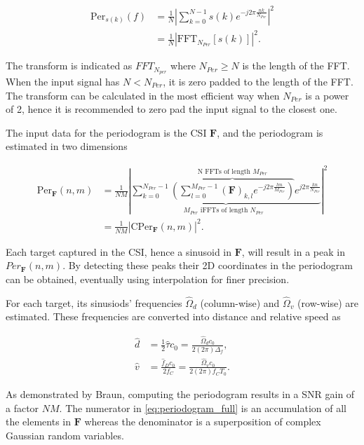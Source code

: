     \begin{align}
        \text{Per}_{s(k)}(f) &= \frac{1}{N}\left| \sum_{k=0}^{N-1} s(k)e^{-j2\pi \frac{nk}{N_{Per}}}\right|^2 \\
        &= \frac{1}{N}\left| \text{FFT}_{N_{Per}}[s(k)]\right|^2.
    \end{align}
    
    
    The transform is indicated as $FFT_{N_{per}}$ where $N_{Per} \geq N$ is the length of the FFT. When the input signal has $N < N_{Per}$, it is zero padded to the length of the FFT.
    The transform can be calculated in the most efficient way when $N_{Per}$ is a power of 2, hence it is recommended to zero pad the input signal to the closest one.

    The input data for the periodogram is the CSI $\bm{F}$, and the periodogram is estimated in two dimensions

    \begin{align}
        \text{Per}_{\bm{F}}(n,m) &= \frac{1}{NM} \left| \underbrace{ \sum_{k=0}^{N_{Per}-1}  \overbrace{\left(  \sum_{l=0}^{M_{Per}-1} (\bm{F})_{k,l} e^{-j2\pi \frac{lm}{M_{Per}}} \right)}^{\text{N FFTs of length $M_{Per}$}}  e^{j2\pi\frac{kn}{N_{Per}}}}_{ \text{$M_{Per}$ iFFTs of length $N_{Per}$ }} \right| ^ 2 \label{eq:periodogram_full}\\
        &= \frac{1}{NM} \left| \text{CPer}_{\bm{F}}(n,m) \right| ^ 2. \label{eq:periodogram_cper}
    \end{align}


    Each target captured in the CSI, hence a sinusoid in $\bm{F}$, will result in a peak in $Per_{\bm{F}}(n,m)$. By detecting these peaks their 2D coordinates in the periodogram can be obtained, eventually using interpolation for finer precision.

    For each target, its sinusiods' frequencies $\hat{\Omega}_d$ (column-wise) and $\hat{\Omega}_v$ (row-wise) are estimated.
    These frequencies are converted into distance and relative speed as

    \begin{align}
        \hat{d} &= \frac{1}{2}\hat{\tau}c_0 = \frac{\hat{\Omega}_d c_0}{2 (2\pi) \Delta_f}, \\
        \hat{v} &= \frac{\hat{f}_D c_0 }{2 f_C} = \frac{\hat{\Omega}_v c_0}{2(2\pi)f_CT_0}.
    \end{align}

    As demonstrated by Braun, computing the periodogram results in a SNR gain of a factor $NM$. The numerator in \ref{eq:periodogram_full} is an accumulation of all the elements in $\bm{F}$ whereas the denominator is a superposition of complex Gaussian random variables.
    
